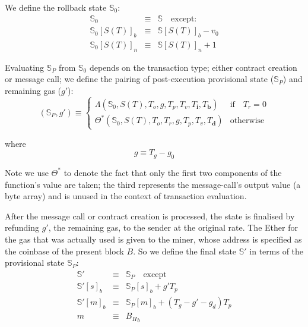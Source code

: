 \documentclass[9pt,oneside]{amsart}
\begin{document}
\begin{multicols}{2}
We define the rollback state $\mathbb{S}_0$:
\begin{eqnarray}
\mathbb{S}_0 & \equiv & \mathbb{S} \quad \text{except:} \\
\mathbb{S}_0[S(T)]_b & \equiv & \mathbb{S}[S(T)]_b - v_0 \\
\mathbb{S}_0[S(T)]_n & \equiv & \mathbb{S}[S(T)]_n + 1
\end{eqnarray}

Evaluating $\mathbb{S}_P$ from $\mathbb{S}_0$ depends on the transaction type; either contract creation or message call; we define the pairing of post-execution provisional state ($\mathbb{S}_P$) and remaining gas ($g'$):
\begin{equation}
(\mathbb{S}_P, g') \equiv \begin{cases}
\Lambda(\mathbb{S}_0, S(T), T_o, g, T_p, T_v, T_\mathbf{i}, T_\mathbf{b}) & \text{if} \quad T_r = 0 \\
\Theta^*(\mathbb{S}_0, S(T), T_o, T_r, g, T_p, T_v, T_\mathbf{d}) & \text{otherwise}
\end{cases}
\end{equation}

where
\begin{equation}
g \equiv T_g - g_0
\end{equation}

Note we use $\Theta^*$ to denote the fact that only the first two components of the function's value are taken; the third represents the message-call's output value (a byte array) and is unused in the context of transaction evaluation.

After the message call or contract creation is processed, the state is finalised by refunding $g'$, the remaining gas, to the sender at the original rate. The Ether for the gas that was actually used is given to the miner, whose address is specified as the coinbase of the present block $B$. So we define the final state $\mathbb{S}'$ in terms of the provisional state $\mathbb{S}_P$:
\begin{eqnarray}
\mathbb{S}' & \equiv & \mathbb{S}_P \quad \text{except} \\
\mathbb{S}'[s]_b & \equiv & \mathbb{S}_P[s]_b + g' T_p \\
\mathbb{S}'[m]_b & \equiv & \mathbb{S}_P[m]_b + (T_g - g' - g_d) T_p \\
m & \equiv & {B_H}_b
\end{eqnarray}



\end{multicols}
\end{document}
